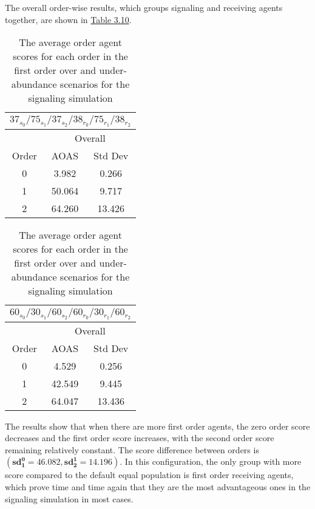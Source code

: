 The overall order-wise results, which groups signaling and receiving agents together, are shown in \hyperref[table:sig-first-order-overall]{Table 3.10}.

\begin{table}[h]
    \centering
    \begin{tabular}{|c|c|c|}
        \hline
        \multicolumn{3}{|c|}{$37_{s_{0}}/75_{s_{1}}/37_{s_{2}}/38_{r_{0}}/75_{r_{1}}/38_{r_{2}}$} \\
        \hline
        \multicolumn{1}{|c|}{} & \multicolumn{2}{|c|}{Overall} \\
        \hline
        Order & AOAS & Std Dev \\
        \hline
        0     & 3.982   & 0.266    \\
        1     & 50.064  & 9.717   \\
        2     & 64.260  & 13.426   \\
        \hline
    \end{tabular}
    \qquad
    \begin{tabular}{|c|c|c|}
        \hline
        \multicolumn{3}{|c|}{$60_{s_{0}}/30_{s_{1}}/60_{s_{2}}/60_{r_{0}}/30_{r_{1}}/60_{r_{2}}$} \\
        \hline
        \multicolumn{1}{|c|}{} & \multicolumn{2}{|c|}{Overall} \\
        \hline
        Order & AOAS & Std Dev \\
        \hline
        0     & 4.529   & 0.256    \\
        1     & 42.549  & 9.445   \\
        2     & 64.047  & 13.436   \\
        \hline
    \end{tabular}
    \caption{The average order agent scores for each order in the first order over and under-abundance scenarios for the signaling simulation}
    \label{table:sig-first-order-overall}
\end{table}

The results show that when there are more first order agents, the zero order score decreases and the first order score increases, with the second order score remaining relatively constant. The score difference between orders is $(\mathbf{sd^0_1 = 46.082}, \mathbf{sd^1_2 = 14.196})$. In this configuration, the only group with more score compared to the default equal population is first order receiving agents, which prove time and time again that they are the most advantageous ones in the signaling simulation in most cases. 

